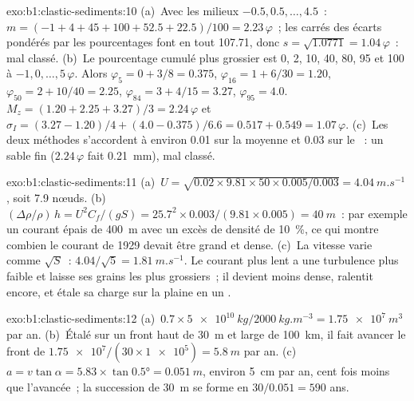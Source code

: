 \begin{solution}{exo:b1:clastic-sediments:10}
(a)~Avec les milieux $-0.5, 0.5, \ldots, 4.5$~: $m = (-1 + 4 + 45 + 100 + 52.5
+ 22.5)/100 = 2.23\,\varphi$~; les carrés des écarts pondérés par les
pourcentages font en tout \num{107.71}, donc $s = \sqrt{1.0771} = 1.04\,\varphi$~:
mal classé. (b)~Le pourcentage cumulé plus grossier est 0, 2, 10, 40, 80, 95 et
100 à $-1, 0, \ldots, 5\,\varphi$. Alors $\varphi_5 = 0 + 3/8 = 0.375$,
$\varphi_{16} = 1 + 6/30 = 1.20$, $\varphi_{50} = 2 + 10/40 = 2.25$,
$\varphi_{84} = 3 + 4/15 = 3.27$, $\varphi_{95} = 4.0$. $M_z = (1.20 + 2.25 +
3.27)/3 = 2.24\,\varphi$ et $\sigma_I = (3.27 - 1.20)/4 + (4.0 - 0.375)/6.6 =
0.517 + 0.549 = 1.07\,\varphi$. (c)~Les deux méthodes s'accordent à environ
\num{0.01} sur la moyenne et \num{0.03} sur le ~: un sable fin
($2.24\,\varphi$ fait \qty{0.21}{mm}), mal classé.
\end{solution}

\begin{solution}{exo:b1:clastic-sediments:11}
(a)~$U = \sqrt{0.02 \times 9.81 \times 50 \times 0.005/0.003} =
\qty{4.04}{m.s^{-1}}$, soit 7.9 nœuds. (b)~$(\Delta\rho/\rho)\,h = U^2
C_f/(gS) = 25.7^2 \times 0.003/(9.81 \times 0.005) = \qty{40}{m}$~: par exemple
un courant épais de \qty{400}{m} avec un excès de densité de \qty{10}{\percent}, ce qui
montre combien le courant de 1929 devait être grand et dense. (c)~La vitesse
varie comme $\sqrt S$~: $4.04/\sqrt 5 = \qty{1.81}{m.s^{-1}}$. Le courant plus lent
a une turbulence plus faible et laisse ses grains les plus grossiers~; il devient moins dense, ralentit
encore, et étale sa charge sur la plaine en un .
\end{solution}

\begin{solution}{exo:b1:clastic-sediments:12}
(a)~$0.7 \times \qty{5e10}{kg}/\qty{2000}{kg.m^{-3}} = \qty{1.75e7}{m^3}$ par
an. (b)~Étalé sur un front haut de \qty{30}{m} et large de \qty{100}{km}, il
fait avancer le front de $\num{1.75e7}/(30 \times \num{1e5}) = \qty{5.8}{m}$ par
an. (c)~$a = v\tan\alpha = 5.83 \times \tan\ang{0.5} = \qty{0.051}{m}$, environ
\qty{5}{cm} par an, cent fois moins que l'avancée~; la
succession de \qty{30}{m} se forme en $30/0.051 = 590$ ans.
\end{solution}


